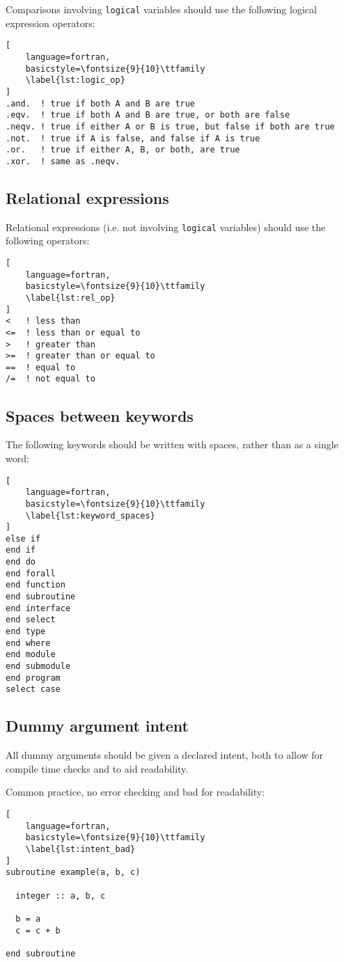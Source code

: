 \documentclass[11pt]{report}
\begin{document}
Comparisons involving \texttt{logical} variables should use the 
following logical expression operators:
\begin{lstlisting}[
	language=fortran,
    basicstyle=\fontsize{9}{10}\ttfamily
    \label{lst:logic_op}
]
.and.  ! true if both A and B are true 
.eqv.  ! true if both A and B are true, or both are false
.neqv. ! true if either A or B is true, but false if both are true
.not.  ! true if A is false, and false if A is true
.or.   ! true if either A, B, or both, are true
.xor.  ! same as .neqv. 
\end{lstlisting}

\subsection{Relational expressions}
Relational expressions (i.e. not involving \texttt{logical} variables) should use the following operators:
\begin{lstlisting}[
	language=fortran,
    basicstyle=\fontsize{9}{10}\ttfamily
    \label{lst:rel_op}
]
<   ! less than
<=  ! less than or equal to
>   ! greater than
>=  ! greater than or equal to
==  ! equal to
/=  ! not equal to
\end{lstlisting}

\subsection{Spaces between keywords}
The following keywords should be written with spaces, rather than as a single word:
\begin{lstlisting}[
	language=fortran,
    basicstyle=\fontsize{9}{10}\ttfamily
    \label{lst:keyword_spaces}
]
else if
end if
end do
end forall
end function
end subroutine
end interface
end select
end type
end where
end module
end submodule
end program
select case
\end{lstlisting}

\subsection{Dummy argument intent}
All dummy arguments should be given a declared intent, both to allow for compile time checks and to aid readability.

Common practice, no error checking and bad for readability:
\begin{lstlisting}[
	language=fortran,
    basicstyle=\fontsize{9}{10}\ttfamily
    \label{lst:intent_bad}
]
subroutine example(a, b, c)

  integer :: a, b, c

  b = a
  c = c + b

end subroutine
\end{lstlisting}
\end{document}
